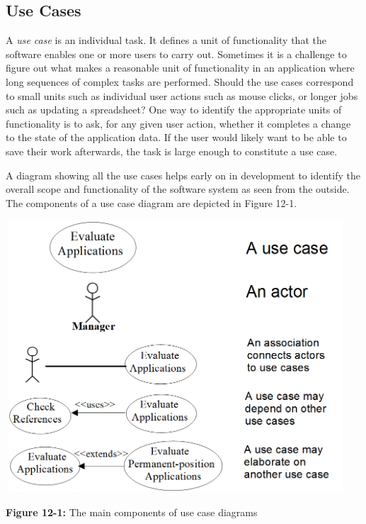 \subsection{Use Cases}

A \textit{use case} is an individual task. It defines a
unit of functionality that the software enables one or more users to
carry out. Sometimes it is a challenge to figure out what makes a
reasonable {\textquotedbl}unit of functionality{\textquotedbl} in an
application where long sequences of complex tasks are performed. Should
the use cases correspond to small units such as individual user actions
such as mouse clicks, or longer jobs such as updating a spreadsheet?
One way to identify the appropriate units of functionality is to ask,
for any given user action, whether it completes a change to the state
of the application data. If the user would likely want to be able to
save their work afterwards, the task is large enough to constitute a
use case.

A diagram showing all the use cases helps early on in development to
identify the overall scope and functionality of the
software system as seen from the outside. The components of a use case
diagram are depicted in Figure 12-1.

\bigskip

\includegraphics[width=5.0in,height=4in]{ub-img/usecase.png}

{\sffamily\bfseries Figure 12-1:}
{\sffamily The main components of use case diagrams}

\bigskip

